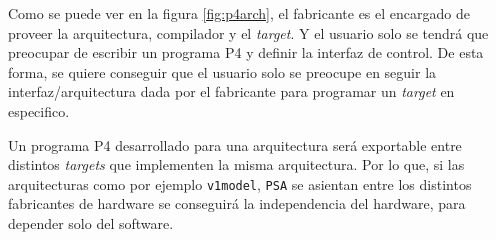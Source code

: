 Como se puede ver en la figura \ref{fig:p4arch}, el fabricante es el encargado de proveer la arquitectura, compilador y el \textit{target}. Y el usuario solo se tendrá que preocupar de escribir un programa P4 y definir la interfaz de control. De esta forma, se quiere conseguir que el usuario solo se preocupe en seguir la interfaz/arquitectura dada por el fabricante para programar un \textit{target} en especifico.\\
\par
Un programa P4 desarrollado para una arquitectura será exportable entre distintos \textit{targets} que implementen la misma arquitectura. Por lo que, si las arquitecturas como por ejemplo \texttt{v1model}, \texttt{PSA} se asientan entre los distintos fabricantes de hardware se conseguirá la independencia del hardware, para depender solo del software.  


    
    
    









